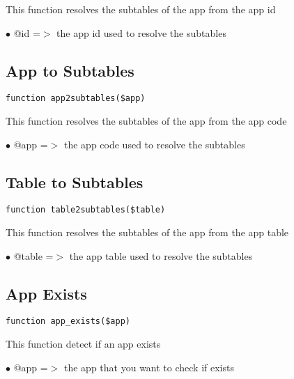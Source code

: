 \documentclass[a4paper]{book}
\begin{document}
This function resolves the subtables of the app from the app id

\begin{compactitem}
\item[\color{myblue}$\bullet$] @id =$>$ the app id used to resolve the subtables
\end{compactitem}

\hypertarget{toc31}{}
\subsection{App to Subtables}

\begin{lstlisting}
function app2subtables($app)
\end{lstlisting}

This function resolves the subtables of the app from the app code

\begin{compactitem}
\item[\color{myblue}$\bullet$] @app =$>$ the app code used to resolve the subtables
\end{compactitem}

\hypertarget{toc32}{}
\subsection{Table to Subtables}

\begin{lstlisting}
function table2subtables($table)
\end{lstlisting}

This function resolves the subtables of the app from the app table

\begin{compactitem}
\item[\color{myblue}$\bullet$] @table =$>$ the app table used to resolve the subtables
\end{compactitem}

\hypertarget{toc33}{}
\subsection{App Exists}

\begin{lstlisting}
function app_exists($app)
\end{lstlisting}

This function detect if an app exists

\begin{compactitem}
\item[\color{myblue}$\bullet$] @app =$>$ the app that you want to check if exists
\end{compactitem}
\end{document}
